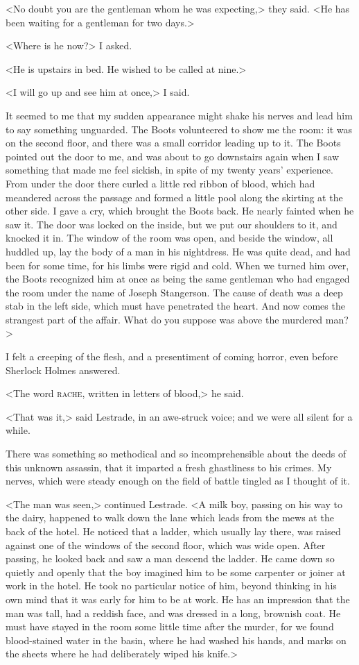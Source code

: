 <No doubt you are the gentleman whom he was expecting,> they said. <He has been waiting for a gentleman for two days.>

<Where is he now?> I asked.

<He is upstairs in bed. He wished to be called at nine.>

<I will go up and see him at once,> I said.

It seemed to me that my sudden appearance might shake his nerves and lead him to say something unguarded. The Boots volunteered to show me the room: it was on the second floor, and there was a small corridor leading up to it. The Boots pointed out the door to me, and was about to go downstairs again when I saw something that made me feel sickish, in spite of my twenty years' experience. From under the door there curled a little red ribbon of blood, which had meandered across the passage and formed a little pool along the skirting at the other side. I gave a cry, which brought the Boots back. He nearly fainted when he saw it. The door was locked on the inside, but we put our shoulders to it, and knocked it in. The window of the room was open, and beside the window, all huddled up, lay the body of a man in his nightdress. He was quite dead, and had been for some time, for his limbs were rigid and cold. When we turned him over, the Boots recognized him at once as being the same gentleman who had engaged the room under the name of Joseph Stangerson. The cause of death was a deep stab in the left side, which must have penetrated the heart. And now comes the strangest part of the affair. What do you suppose was above the murdered man?>

I felt a creeping of the flesh, and a presentiment of coming horror, even before Sherlock Holmes answered.

<The word \textsc{rache}, written in letters of blood,> he said.

<That was it,> said Lestrade, in an awe-struck voice; and we were all silent for a while.

There was something so methodical and so incomprehensible about the deeds of this unknown assassin, that it imparted a fresh ghastliness to his crimes. My nerves, which were steady enough on the field of battle tingled as I thought of it.

<The man was seen,> continued Lestrade. <A milk boy, passing on his way to the dairy, happened to walk down the lane which leads from the mews at the back of the hotel. He noticed that a ladder, which usually lay there, was raised against one of the windows of the second floor, which was wide open. After passing, he looked back and saw a man descend the ladder. He came down so quietly and openly that the boy imagined him to be some carpenter or joiner at work in the hotel. He took no particular notice of him, beyond thinking in his own mind that it was early for him to be at work. He has an impression that the man was tall, had a reddish face, and was dressed in a long, brownish coat. He must have stayed in the room some little time after the murder, for we found blood-stained water in the basin, where he had washed his hands, and marks on the sheets where he had deliberately wiped his knife.>

